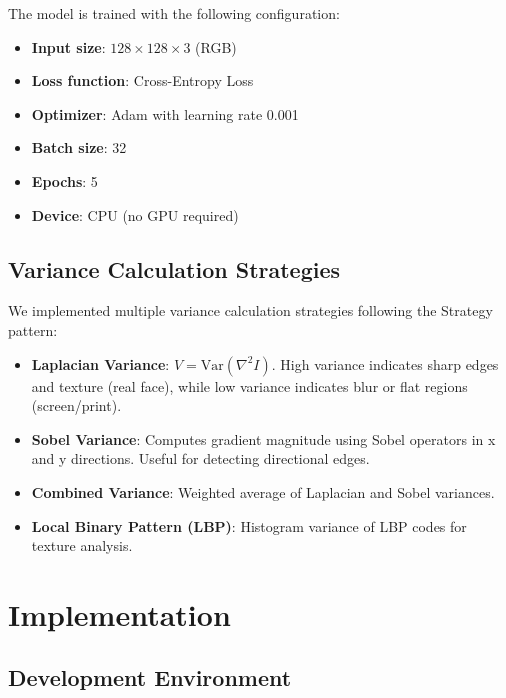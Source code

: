 \documentclass[conference]{IEEEtran}
\begin{document}
The model is trained with the following configuration:
\begin{itemize}
    \item \textbf{Input size}: $128 \times 128 \times 3$ (RGB)
    \item \textbf{Loss function}: Cross-Entropy Loss
    \item \textbf{Optimizer}: Adam with learning rate 0.001
    \item \textbf{Batch size}: 32
    \item \textbf{Epochs}: 5
    \item \textbf{Device}: CPU (no GPU required)
\end{itemize}

\subsection{Variance Calculation Strategies}

We implemented multiple variance calculation strategies following the Strategy pattern:

\begin{itemize}
    \item \textbf{Laplacian Variance}: $V = \text{Var}(\nabla^2 I)$. High variance indicates sharp edges and texture (real face), while low variance indicates blur or flat regions (screen/print).
    \item \textbf{Sobel Variance}: Computes gradient magnitude using Sobel operators in x and y directions. Useful for detecting directional edges.
    \item \textbf{Combined Variance}: Weighted average of Laplacian and Sobel variances.
    \item \textbf{Local Binary Pattern (LBP)}: Histogram variance of LBP codes for texture analysis.
\end{itemize}

\section{Implementation}
\label{sec:implementation}

\subsection{Development Environment}
\end{document}
